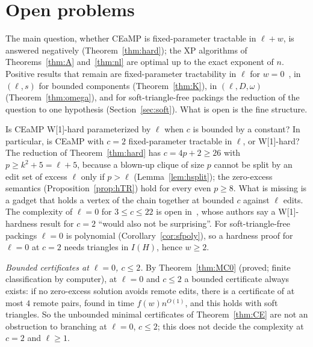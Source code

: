 \section{Open problems}\label{sec:open}
The main question, whether CEaMP is fixed-parameter tractable in $\ell+w$, is answered negatively (Theorem~\ref{thm:hard}); the XP algorithms of Theorems~\ref{thm:A} and~\ref{thm:nl} are optimal up to the exact exponent of $n$. Positive results that remain are fixed-parameter tractability in $\ell$ for $w=0$~\cite{BFK18}, in $(\ell,s)$ for bounded components (Theorem~\ref{thm:K}), in $(\ell,D,\omega)$ (Theorem~\ref{thm:omega}), and for soft-triangle-free packings the reduction of the question to one hypothesis (Section~\ref{sec:soft}). What is open is the fine structure.

\begin{problem}[Hardness for bounded $c$; $c=2$]\label{op:boundc}\label{op:c2}
Is CEaMP W[1]-hard parameterized by $\ell$ when $c$ is bounded by a constant? In particular, is CEaMP with $c=2$ fixed-parameter tractable in $\ell$, or W[1]-hard? The reduction of Theorem~\ref{thm:hard} has $c=4p+2\ge26$ with $p\ge k^2+5=\ell+5$, because a blown-up clique of size $p$ cannot be split by an edit set of excess $\ell$ only if $p>\ell$ (Lemma~\ref{lem:hsplit}); the zero-excess semantics (Proposition~\ref{prop:hTR}) hold for every even $p\ge8$. What is missing is a gadget that holds a vertex of the chain together at bounded $c$ against $\ell$ edits. The complexity of $\ell=0$ for $3\le c\le22$ is open in~\cite{LPS23}, whose authors say a W[1]-hardness result for $c=2$ ``would also not be surprising''. For soft-triangle-free packings $\ell=0$ is polynomial (Corollary~\ref{cor:sfpoly}), so a hardness proof for $\ell=0$ at $c=2$ needs triangles in $I(H)$, hence $w\ge2$.

\emph{Bounded certificates at $\ell=0$, $c\le2$.} By Theorem~\ref{thm:MC0} (proved; finite classification by computer), at $\ell=0$ and $c\le2$ a bounded certificate always exists: if no zero-excess solution avoids remote edits, there is a certificate of at most $4$ remote pairs, found in time $f(w)n^{O(1)}$, and this holds with soft triangles. So the unbounded minimal certificates of Theorem~\ref{thm:CE} are not an obstruction to branching at $\ell=0$, $c\le2$; this does not decide the complexity at $c=2$ and $\ell\ge1$.
\end{problem}
